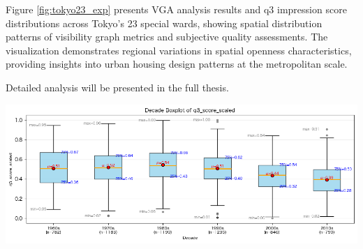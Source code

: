 \documentclass[11pt,a4paper]{article}
\begin{document}
\begin{multicols}{2}



Figure \ref{fig:tokyo23_exp} presents VGA analysis results and q3 impression score distributions across Tokyo's 23 special wards, showing 
spatial distribution patterns of visibility graph metrics and subjective quality assessments. The visualization demonstrates regional 
variations in spatial openness characteristics, providing insights into urban housing design patterns 
at the metropolitan scale.

Detailed analysis will be presented in the full thesis.

\begin{flushleft}
    \includegraphics[width=0.9\columnwidth]{plots/q3_10years_box.png}
    \label{fig:q3_10years_box}
\end{flushleft}


\end{multicols}
\end{document}

